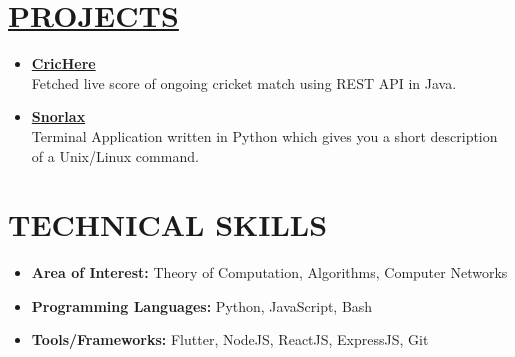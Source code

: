 \documentclass[line, margin, 12pt]{res}
\begin{document}
\begin{resume}
\section{\hyperref[https://www.github.com/darshansharma]{PROJECTS}}
\begin{itemize}
\item \textbf{\href{https://github.com/darshansharma/CricHere/blob/master/src/test/Test.java}{CricHere}}\\
Fetched live score of ongoing cricket match using REST API in Java.
\item \textbf{\href{https://github.com/darshansharma/snorlax}{Snorlax}}\\
Terminal Application written in Python which gives you a short description of a Unix/Linux command.
\end{itemize}

\section{TECHNICAL SKILLS}
\begin{itemize}
\item \textbf{Area of Interest:} Theory of Computation, Algorithms, Computer Networks
\item \textbf{Programming Languages:}  Python, JavaScript, Bash
\item \textbf{Tools/Frameworks:} Flutter,  NodeJS, ReactJS, ExpressJS, Git\\
\end{itemize}

\end{resume}
\end{document}
